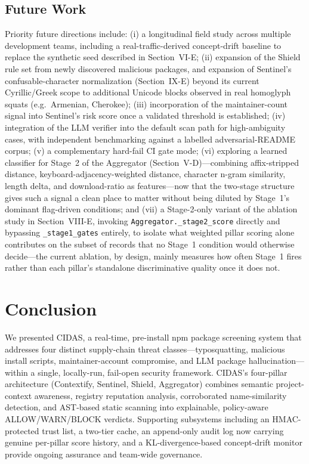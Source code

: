 \documentclass[journal]{IEEEtran}
\begin{document}
\subsection{Future Work}
Priority future directions include: (i) a longitudinal field study across multiple development teams,
including a real-traffic-derived concept-drift baseline to replace the synthetic seed described in
Section~VI-E; (ii) expansion of the Shield rule set from newly discovered malicious packages, and expansion
of Sentinel's confusable-character normalization (Section~IX-E) beyond its current Cyrillic/Greek scope to
additional Unicode blocks observed in real homoglyph squats (e.g.\ Armenian, Cherokee); (iii) incorporation
of the maintainer-count signal into Sentinel's risk score once a validated threshold is established; (iv)
integration of the LLM verifier into the default scan path for high-ambiguity cases, with independent
benchmarking against a labelled adversarial-README corpus; (v) a complementary hard-fail CI gate mode; (vi)
exploring a learned classifier for Stage~2 of the Aggregator (Section~V-D)---combining affix-stripped distance,
keyboard-adjacency-weighted distance, character n-gram similarity, length delta, and download-ratio as
features---now that the two-stage structure gives such a signal a clean place to matter without being
diluted by Stage~1's dominant flag-driven conditions; and (vii) a Stage-2-only variant of the ablation study
in Section~VIII-E, invoking \texttt{Aggregator.\_stage2\_score} directly and bypassing
\texttt{\_stage1\_gates} entirely, to isolate what weighted pillar scoring alone contributes on the subset of
records that no Stage~1 condition would otherwise decide---the current ablation, by design, mainly measures
how often Stage~1 fires rather than each pillar's standalone discriminative quality once it does not.

\section{Conclusion}
We presented CIDAS, a real-time, pre-install npm package screening system that addresses four distinct
supply-chain threat classes---typosquatting, malicious install scripts, maintainer-account compromise, and
LLM package hallucination---within a single, locally-run, fail-open security framework. CIDAS's four-pillar
architecture (Contextify, Sentinel, Shield, Aggregator) combines semantic project-context awareness, registry
reputation analysis, corroborated name-similarity detection, and AST-based static scanning into explainable,
policy-aware ALLOW/WARN/BLOCK verdicts. Supporting subsystems including an HMAC-protected trust list, a
two-tier cache, an append-only audit log now carrying genuine per-pillar score history, and a
KL-divergence-based concept-drift monitor provide ongoing assurance and team-wide governance.
\end{document}
